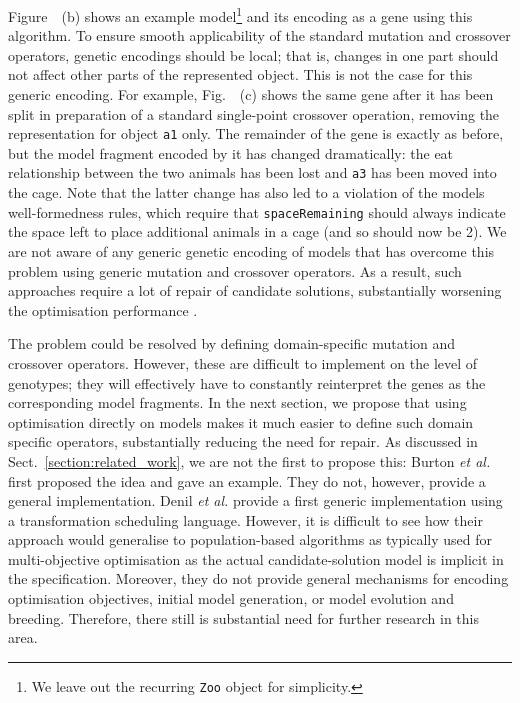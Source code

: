 	
	Figure~~(b) shows an example model\footnote{We leave out the recurring \texttt{Zoo} object for simplicity.} and its encoding as a gene
	using this algorithm. To ensure smooth applicability of the standard mutation and crossover operators, genetic encodings should be local; that is, changes
	in one part should not affect other parts of the represented object. This is not the case for this generic encoding. For example, Fig.~~(c)
	shows the same gene after it has been split in preparation of a standard single-point crossover operation, removing the representation for object \texttt{a1}
	only. The remainder of the gene is exactly as before, but the model fragment encoded by it has changed dramatically: the eat relationship between the two animals
	has been lost and \texttt{a3} has been moved into the cage. Note that the latter change has also led to a violation of the models well-formedness rules, which
	require that \texttt{spaceRemaining} should always indicate the space left to place additional animals in a cage (and so should now be 2). We are not aware of
	any generic genetic encoding of models that has overcome this problem using generic mutation and crossover operators. As a result, such approaches require a lot
	of repair of candidate solutions, substantially worsening the optimisation performance \cite{Efstathiou+14b}.
	
	The problem could be resolved by defining domain-specific mutation and crossover operators. However, these are difficult to implement on the level of genotypes;  
	they will effectively have to constantly reinterpret the genes as the corresponding model fragments. In the next section, we propose that using optimisation
	directly on models makes it much easier to define such domain specific operators, substantially reducing the need for repair. As discussed in 
	Sect.~\ref{section:related_work}, we are not the first to propose this: Burton \emph{et al.} \cite{Burton+12,BurtonPoulding13} first proposed the idea and gave
	an example. They do not, however, provide a general implementation. Denil \emph{et al.} \cite{Denil+14} provide a first generic implementation using a
	transformation scheduling language. However, it is difficult to see how their approach would generalise to population-based algorithms as typically used for 
	multi-objective optimisation as the actual candidate-solution model is implicit in the specification. Moreover, they do not provide general mechanisms for
	encoding optimisation objectives, initial model generation, or model evolution and breeding. Therefore, there still is substantial need for further research in
	this area.